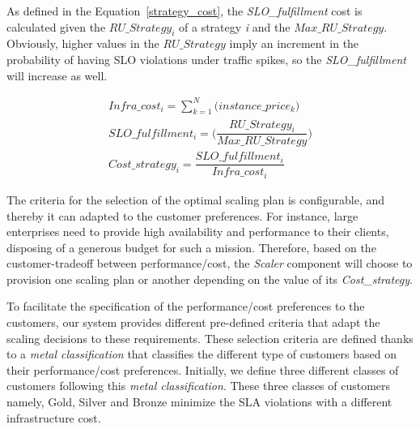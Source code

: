 As defined in the Equation~\ref{strategy_cost}, the \emph{SLO\_fulfillment} cost is calculated given the \emph{$RU\_Strategy_{i}$} of a strategy \emph{i} and the \emph{$Max\_RU\_Strategy$}. Obviously, higher values in the \emph{$RU\_Strategy$} imply an increment in the probability of having SLO violations under traffic spikes, so the \emph{SLO\_fulfillment} will increase as well. 



{\scriptsize
\begin{equation}\label{strategy_cost}
\begin{split}
Infra\_cost_{i} = \sum_{k=1}^N \big( instance\_price_{k} \big) \\
SLO\_fulfillment_{i} =  \bigg( \dfrac{ RU\_Strategy_{i} } {Max\_RU\_Strategy} \bigg)  \\
Cost\_strategy_{i} = \dfrac{  SLO\_fulfillment_{i}  } {Infra\_cost_{i}}
\end{split}
\end{equation}
}


The criteria for the selection of the optimal scaling plan is configurable, and thereby it can adapted to the customer preferences. For instance, large enterprises need to provide high availability and performance to their clients, disposing of a generous budget for such a mission. Therefore, based on the customer-tradeoff between performance/cost, the \emph{Scaler} component will choose to provision one scaling plan or another depending on the value of its \emph{Cost\_strategy}. 

To facilitate the specification of the performance/cost preferences to the customers, our system provides different pre-defined criteria that adapt the scaling decisions to these requirements. These selection criteria are defined thanks to a \emph{metal classification} that classifies  the different type of customers based on their performance/cost preferences. Initially, we define three different classes of customers following this \emph{metal classification}. These three classes of customers namely, Gold, Silver and Bronze minimize the SLA violations with a different infrastructure cost. 

